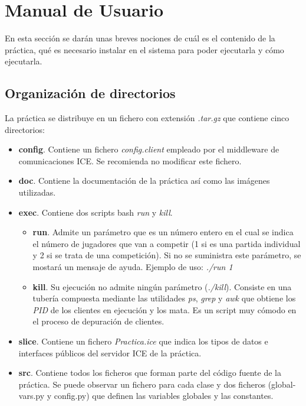 \chapter {Manual de Usuario}

En esta sección se darán unas breves nociones de cuál es el contenido
de la práctica, qué es necesario instalar en el sistema para poder
ejecutarla y cómo ejecutarla.

\section{Organización de directorios}
La práctica se distribuye en un fichero con extensión \emph{.tar.gz}
que contiene cinco directorios:
\begin{itemize}
\item \textbf{config}. Contiene un fichero \emph{config.client}
  empleado por el middleware de comunicaciones ICE. Se recomienda no
  modificar este fichero.
\item \textbf{doc}. Contiene la documentación de la práctica así como
  las imágenes utilizadas.
\item \textbf{exec}. Contiene dos scripts bash \emph{run} y \emph{kill}.
  \begin{itemize}
  \item \textbf{run}. Admite un parámetro que es un número entero en
    el cual se indica el número de jugadores que van a competir (1 si
    es una partida individual y 2 si se trata de una competición). Si
    no se suministra este parámetro, se mostará un mensaje de
    ayuda. Ejemplo de uso: \emph{./run 1}
  \item \textbf{kill}. Su ejecución no admite ningún parámetro
    (\emph{./kill}). Consiste en una tubería compuesta mediante las
    utilidades \emph{ps}, \emph{grep} y \emph{awk} que obtiene los
    \emph{PID} de los clientes en ejecución y los mata. Es un script
    muy cómodo en el proceso de depuración de clientes.
  \end{itemize}
\item \textbf{slice}. Contiene un fichero \emph{Practica.ice} que
  indica los tipos de datos e interfaces públicos del servidor ICE de
  la práctica.
\item \textbf{src}. Contiene todos los ficheros que forman parte del
  código fuente de la práctica. Se puede observar un fichero para cada
  clase y dos ficheros (global-vars.py y config.py) que definen las
  variables globales y las constantes.
\end{itemize}


